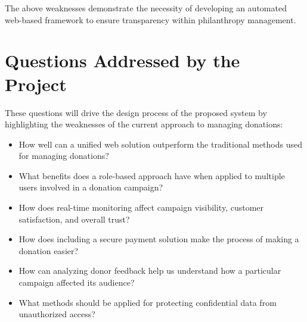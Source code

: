 \documentclass{thesis-library}
\begin{document}
The above weaknesses demonstrate the necessity of developing an automated web-based framework to ensure transparency within philanthropy management.

\section{Questions Addressed by the Project}

These questions will drive the design process of the proposed system by highlighting the weaknesses of the current approach to managing donations:
\begin{itemize}
    \item How well can a unified web solution outperform the traditional methods used for managing donations?
    \item What benefits does a role-based approach have when applied to multiple users involved in a donation campaign?
    \item How does real-time monitoring affect campaign visibility, customer satisfaction, and overall trust?
    \item How does including a secure payment solution make the process of making a donation easier?
    \item How can analyzing donor feedback help us understand how a particular campaign affected its audience?
    \item What methods should be applied for protecting confidential data from unauthorized access?
\end{itemize}

\newpage
\end{document}
